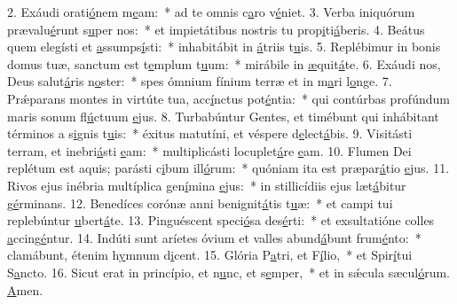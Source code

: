 2. Exáudi orati\uline{ó}nem m\uline{e}am:~* ad te omnis c\uline{a}ro v\uline{é}niet.
3. Verba iniquórum prævalu\uline{é}runt s\uline{u}per nos:~* et impietátibus nostris tu prop\uline{i}ti\uline{á}beris.
4. Beátus quem elegísti et \uline{a}ssumps\uline{í}sti:~* inhabitábit in \uline{á}triis t\uline{u}is.
5. Replébimur in bonis domus tuæ, sanctum est t\uline{e}mplum t\uline{u}um:~* mirábile in \uline{æ}quit\uline{á}te.
6. Exáudi nos, Deus salut\uline{á}ris n\uline{o}ster:~* spes ómnium fínium terræ et in m\uline{a}ri l\uline{o}nge.
7. Prǽparans montes in virtúte tua, acc\uline{í}nctus pot\uline{é}ntia:~* qui contúrbas profúndum maris sonum fl\uline{ú}ctuum \uline{e}jus.
8. Turbabúntur Gentes, et timébunt qui inhábitant términos a s\uline{i}gnis t\uline{u}is:~* éxitus matutíni, et véspere d\uline{e}lect\uline{á}bis.
9. Visitásti terram, et inebri\uline{á}sti \uline{e}am:~* multiplicásti locuplet\uline{á}re \uline{e}am.
10. Flumen Dei replétum est aquis; parásti c\uline{i}bum ill\uline{ó}rum:~* quóniam ita est præpar\uline{á}tio \uline{e}jus.
11. Rivos ejus inébria multíplica gen\uline{í}mina \uline{e}jus:~* in stillicídiis ejus læt\uline{á}bitur g\uline{é}rminans.
12. Benedíces corónæ anni benignit\uline{á}tis t\uline{u}æ:~* et campi tui replebúntur \uline{u}bert\uline{á}te.
13. Pinguéscent speci\uline{ó}sa des\uline{é}rti:~* et exsultatióne colles \uline{a}ccing\uline{é}ntur.
14. Indúti sunt aríetes óvium et valles abund\uline{á}bunt frum\uline{é}nto:~* clamábunt, étenim h\uline{y}mnum d\uline{i}cent.
15. Glória P\uline{a}tri, et F\uline{í}lio,~* et Spir\uline{í}tui S\uline{a}ncto.
16. Sicut erat in princípio, et n\uline{u}nc, et s\uline{e}mper,~* et in sǽcula sæcul\uline{ó}rum. \uline{A}men.
